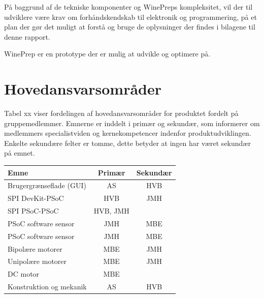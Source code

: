 På baggrund af de tekniske komponenter og WinePreps kompleksitet, vil der til udviklere være krav om forhåndskendskab til elektronik og programmering, på et plan der gør det muligt at forstå og bruge de oplysninger der findes i bilagene til denne rapport.

WinePrep er en prototype der er mulig at udvikle og optimere på.

\section{Hovedansvarsområder}
Tabel xx viser fordelingen af hovedansvarsområder for produktet fordelt på gruppemedlemmer. Emnerne er inddelt i primær og sekundær, som informerer om medlemmers specialistviden og kernekompetencer indenfor produktudviklingen. Enkelte sekundære felter er tomme, dette betyder at ingen har været sekundær på emnet.\\

\begin{tabular}{| l | c | c |}
\hline
Emne & Primær & Sekundær\\\hline
Brugergrænseflade (GUI) & AS & HVB\\\hline
SPI DevKit-PSoC & HVB & JMH\\\hline
SPI PSoC-PSoC & HVB, JMH & \\\hline
PSoC software sensor & JMH & MBE\\\hline
PSoC software sensor & JMH & MBE\\\hline
Bipolære motorer & MBE & JMH\\\hline
Unipolære motorer & MBE & JMH\\\hline
DC motor & MBE & \\\hline
Konstruktion og mekanik & AS & HVB\\\hline
\end{tabular}